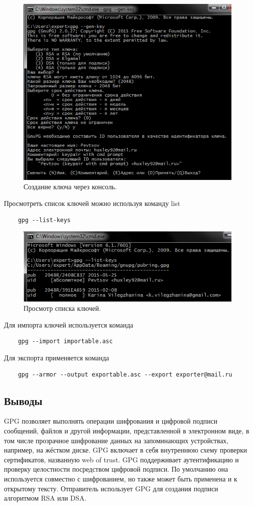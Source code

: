 \documentclass[a4paper, 14pt]{article}				%
\begin{document}
\begin{figure}[h!]
\centering
\includegraphics[width=\textwidth]{fig13}
\caption{Создание ключа через консоль.}
\end{figure}
Просмотреть список ключей можно используя команду list
\begin{verbatim}
	gpg --list-keys
\end{verbatim}

\begin{figure}[h!]
\centering
\includegraphics[width=\textwidth]{fig14}
\caption{Просмотр списка ключей.}
\end{figure}

Для импорта ключей используется команда
\begin{verbatim}
	gpg --import importable.asc
\end{verbatim}
Для экспорта применяется команда
\begin{verbatim}
	gpg --armor --output exportable.asc --export exporter@mail.ru
\end{verbatim}

\subsection{Выводы}
GPG позволяет выполнять операции шифрования и цифровой подписи сообщений, файлов и другой информации, представленной в электронном виде, в том числе прозрачное шифрование данных на запоминающих устройствах, например, на жёстком диске. GPG включает в себя внутреннюю схему проверки сертификатов, названную web of trust. GPG поддерживает аутентификацию и проверку целостности посредством цифровой подписи. По умолчанию она используется совместно с шифрованием, но также может быть применена и к открытому тексту. Отправитель использует GPG для создания подписи алгоритмом RSA или DSA.
\end{document}
